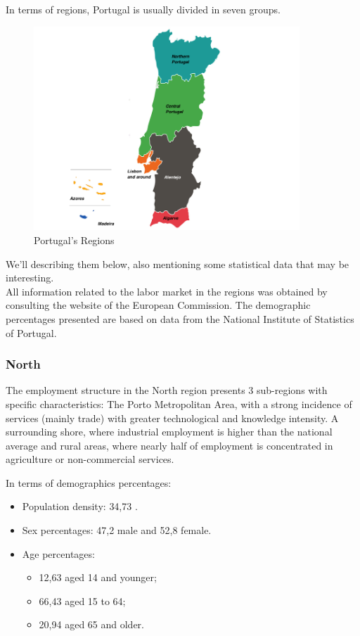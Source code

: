 In terms of regions, Portugal is usually divided in seven groups.


\begin{figure}[h]
\centering %
\includegraphics[width=10cm]{images/portugal.png} 

\caption{Portugal's Regions}
\label{figura:qualquernome}
\end{figure}

We'll describing them below, also mentioning some statistical data that may be interesting. \\
All information related to the labor market in the regions was obtained by consulting the \cite{trab} website of the European Commission. The demographic percentages presented are based on data from the National Institute of Statistics of Portugal. 

\subsubsection{North}
The employment structure in the North region presents 3 sub-regions with specific characteristics: 
The Porto Metropolitan Area, with a strong incidence of services (mainly trade) with greater technological and knowledge intensity. A surrounding shore, where industrial employment is  higher than the national average and rural areas, where nearly half of employment is concentrated in agriculture or non-commercial services.

In terms of demographics percentages:
    \begin{itemize}
        \item Population density: {34,73\textdiscount} . 
        \item Sex percentages: {47,2\textdiscount} male and {52,8\textdiscount} female.
        \item Age percentages: 
        \begin{itemize}
        \item {12,63 \textdiscount} aged 14 and younger;
        \item {66,43\textdiscount} aged 15 to 64;
        \item {20,94\textdiscount} aged 65 and older.
        \end{itemize}
    \end{itemize}


